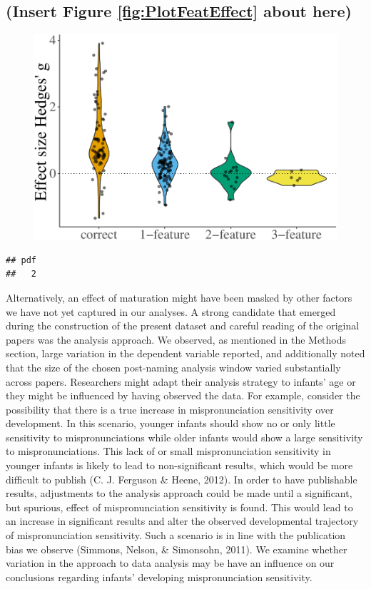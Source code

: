 \documentclass[man]{apa6}
\theoremstyle{definition}
\theoremstyle{definition}
\theoremstyle{definition}
\theoremstyle{remark}
\begin{document}
\subsection{(Insert Figure \ref{fig:PlotFeatEffect} about
here)}\label{insert-figure-reffigplotfeateffect-about-here}

\begin{figure}
\centering
\includegraphics{VonHolzenBergmann_MPMetaAnalysis_files/figure-latex/PlotFeatEffect-1.pdf}
\caption{}
\end{figure}

\begin{verbatim}
## pdf 
##   2
\end{verbatim}

Alternatively, an effect of maturation might have been masked by other
factors we have not yet captured in our analyses. A strong candidate
that emerged during the construction of the present dataset and careful
reading of the original papers was the analysis approach. We observed,
as mentioned in the Methods section, large variation in the dependent
variable reported, and additionally noted that the size of the chosen
post-naming analysis window varied substantially across papers.
Researchers might adapt their analysis strategy to infants' age or they
might be influenced by having observed the data. For example, consider
the possibility that there is a true increase in mispronunciation
sensitivity over development. In this scenario, younger infants should
show no or only little sensitivity to mispronunciations while older
infants would show a large sensitivity to mispronunciations. This lack
of or small mispronunciation sensitivity in younger infants is likely to
lead to non-significant results, which would be more difficult to
publish (C. J. Ferguson \& Heene, 2012). In order to have publishable
results, adjustments to the analysis approach could be made until a
significant, but spurious, effect of mispronunciation sensitivity is
found. This would lead to an increase in significant results and alter
the observed developmental trajectory of mispronunciation sensitivity.
Such a scenario is in line with the publication bias we observe
(Simmons, Nelson, \& Simonsohn, 2011). We examine whether variation in
the approach to data analysis may be have an influence on our
conclusions regarding infants' developing mispronunciation sensitivity.
\end{document}
